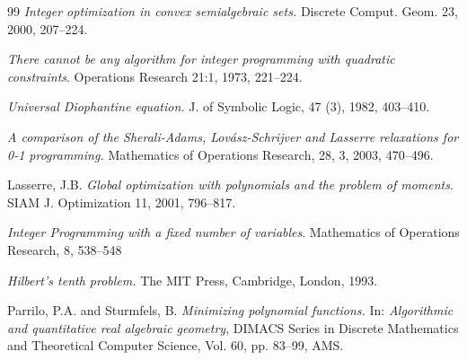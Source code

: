 \documentclass[twoside]{article}
\newcommand{\1}{{\bf 1}}
\begin{document}
\begin{thebibliography}{99}
 {\em Integer
optimization in convex semialgebraic sets.} Discrete Comput. Geom. 23,
2000, 207--224.

 {\em There cannot be any algorithm
    for integer programming with quadratic constraints}. Operations
  Research 21:1, 1973, 221--224.

 {\em Universal Diophantine equation.} J. of
Symbolic Logic, 47 (3), 1982, 403--410.

  {\em A comparison of the
Sherali-Adams, Lov\'asz-Schrijver and Lasserre relaxations for 0-1
programming.} Mathematics of Operations Research, 28, 3, 2003, 470--496. 

 {Lasserre, J.B.} {\em Global optimization with
    polynomials and the problem of moments}.  SIAM J. Optimization 11,
  2001, 796--817.

 {\em Integer Programming with a
fixed number of variables}.  {Mathematics of Operations Research}, 8, 538--548

 {\em Hilbert's tenth problem.} The MIT Press, Cambridge, London, 1993.

 {Parrilo, P.A. and Sturmfels, B.} {\em
    Minimizing polynomial functions.} In: {\sl Algorithmic and
  quantitative real algebraic geometry}, DIMACS Series in Discrete
  Mathematics and Theoretical Computer Science, Vol. 60, pp. 83--99,
  AMS.
\end{thebibliography}
\end{document}
